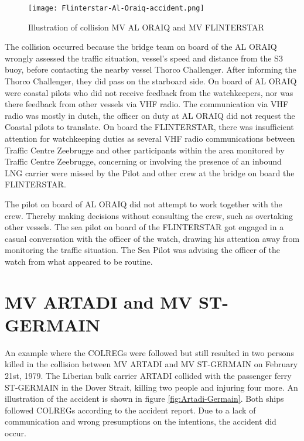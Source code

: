 \begin{figure}[H]
	\centering
	\texttt{[image: Flinterstar-Al-Oraiq-accident.png]}
	\caption{Illustration of collision MV AL ORAIQ and MV FLINTERSTAR}
	\label{fig:Accident-Flinterstar-Al-Oraiq}
\end{figure}
The collision occurred because the bridge team on board of the AL ORAIQ wrongly assessed the traffic situation, vessel's speed and distance from the S3 buoy, before contacting the nearby vessel Thorco Challenger. After informing the Thorco Challenger, they did pass on the starboard side. On board of AL ORAIQ were coastal pilots who did not receive feedback from the watchkeepers, nor was there feedback from other vessels via \ac{VHF} radio. The communication via VHF radio was mostly in dutch, the officer on duty at AL ORAIQ did not request the Coastal pilots to translate.
On board the FLINTERSTAR, there was insufficient attention for watchkeeping duties as several VHF radio communications between Traffic Centre Zeebrugge and other participants within the area monitored by Traffic Centre Zeebrugge, concerning or involving the presence of an inbound LNG carrier were missed by the Pilot and other crew at the bridge on board the FLINTERSTAR.

The pilot on board of AL ORAIQ did not attempt to work together with the crew. Thereby making decisions without consulting the crew, such as overtaking other vessels. 
The sea pilot on board of the FLINTERSTAR got engaged in a casual conversation with the officer of the watch, drawing his attention away from monitoring the traffic situation. The Sea Pilot was advising the officer of the watch from what appeared to be routine. \cite{Backer2015}

\newpage
\section{MV ARTADI and MV ST-GERMAIN}
\label{sec:artadiVSst-germain}
An example where the \ac{COLREGs} were followed but still resulted in two persons killed in the collision between MV ARTADI and MV ST-GERMAIN on February 21st, 1979. The Liberian bulk carrier ARTADI collided with the passenger ferry ST-GERMAIN in the Dover Strait, killing two people and injuring four more. An illustration of the accident is shown in figure \ref{fig:Artadi-Germain}. Both ships followed  \ac{COLREGs} according to the accident report. Due to a lack of communication and wrong presumptions on the intentions, the accident did occur.

